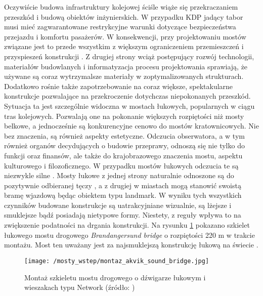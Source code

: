 Oczywiście budowa infrastruktury kolejowej ściśle wiąże się przekraczaniem przeszkód i budową obiektów inżynierskich. W przypadku KDP jadący tabor musi mieć zagwarantowane restrykcyjne warunki dotyczące bezpieczeństwa przejazdu i komfortu pasażerów. W konsekwencji, przy projektowaniu mostów związane jest to przede wszystkim z większym ograniczeniem przemieszczeń i przyspieszeń konstrukcji \parencite{Niemierko2012}. Z drugiej strony wciąż postępujący rozwój technologii, materiałów budowlanych i informatyzacja procesu projektowania sprawiają, że używane są coraz wytrzymalsze materiały w zoptymalizowanych strukturach. Dodatkowo rośnie także zapotrzebowanie na coraz większe, spektakularne konstrukcje pozwalające na przekroczenie dotychczas niepokonanych przeszkód. Sytuacja ta jest szczególnie widoczna w mostach łukowych, popularnych w ciągu tras kolejowych. Pozwalają one na pokonanie większych rozpiętości niż mosty belkowe, a jednocześnie są konkurencyjne cenowo do mostów kratownicowych. Nie bez znaczenia, są również aspekty estetyczne. Odczucia obserwatora, a w tym również organów decydujących o budowie przeprawy, odnoszą się nie tylko do funkcji oraz finansów, ale także do krajobrazowego znaczenia mostu, aspektu kulturowego i filozoficznego. W przypadku mostów łukowych odczucia te są niezwykle silne \parencite{Kido_Cywiński_2019,Kido_Cywiński_2021}. Mosty łukowe z jednej strony naturalnie odnoszone są do pozytywnie odbieranej tęczy \parencite{Prandowski1994}, a z drugiej w miastach mogą stanowić swoistą bramę wjazdową będąc obiektem typu landmark. W wyniku tych wszystkich czynników budowane konstrukcje są uatrakcyjniane wizualnie, są lżejsze i smuklejsze bądź posiadają nietypowe formy. Niestety, z reguły wpływa to na zwiększenie podatności na drgania konstrukcji. Na rysunku \ref{fig:bridges_arch_monatage} pokazano szkielet łukowego mostu drogowego \textit{Brandangersund bridge} o rozpiętości 220 m w trakcie montażu. Most ten uważany jest za najsmuklejszą konstrukcję łukową na świecie \parencite{Larssen2011}.

\begin{figure}[hbt!]
	\centering
	\texttt{[image: /mosty\_wstep/montaz\_akvik\_sound\_bridge.jpg]}
	\captionsetup{justification=centering}
	\caption{Montaż szkieletu mostu drogowego o dźwigarze łukowym i wieszakach typu Network (źródło: \parencite{Tveit2014})}
	\label{fig:bridges_arch_monatage}
\end{figure}

